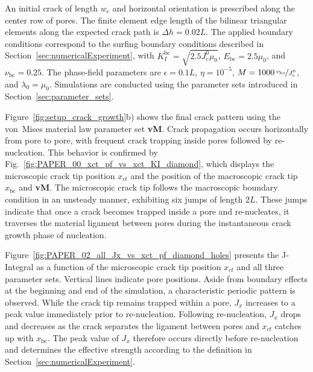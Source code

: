 \documentclass[pdflatex,sn-mathphys-num]{sn-jnl}%
\newcommand{\vMLabel}{\textbf{vM}\xspace}
\theoremstyle{thmstyleone}%
\theoremstyle{thmstyletwo}%
\theoremstyle{thmstylethree}%
\begin{document}
An initial crack of length $w_c$ and horizontal orientation is prescribed along the center row of pores. The finite element edge length of the bilinear triangular elements along the expected crack path is $\Delta h = 0.02L$. The applied boundary conditions correspond to the surfing boundary conditions described in Section~\ref{sec:numericalExperiment}, with $K_I^{\text{bc}} = \sqrt{2.5 J_c^0 \mu_0}$, $E_{\text{bc}} = 2.5 \mu_0$, and $\nu_{\text{bc}} = 0.25$. The phase-field parameters are $\epsilon = 0.1L$, $\eta = 10^{-5}$, $M = 1000\,\nicefrac{v_{\text{bc}}}{J_c^0}$, and $\lambda_0 = \mu_0$. Simulations are conducted  using the parameter sets introduced in Section~\ref{sec:parameter_sets}.

Figure~\ref{fig:setup_crack_growth}b) shows the final crack pattern  using the von~Mises material law parameter set \vMLabel. Crack propagation occurs horizontally from pore to pore, with frequent crack trapping inside pores followed by re-nucleation. This behavior is confirmed by Fig.~\ref{fig:PAPER_00_xct_pf_vs_xct_KI_diamond}, which displays the microscopic crack tip position $x_{ct}$ and the position of the macroscopic crack tip $x_{\text{bc}}$  and \vMLabel. The microscopic crack tip follows the macroscopic boundary condition in an unsteady manner, exhibiting six jumps of length $2L$. These jumps indicate that once a crack becomes trapped inside a pore and re-nucleates, it traverses the material ligament between pores during the instantaneous crack growth phase of nucleation.

Figure~\ref{fig:PAPER_02_all_Jx_vs_xct_pf_diamond_holes} presents the J-Integral as a function of the microscopic crack tip position $x_{ct}$  and all three parameter sets. Vertical lines indicate pore positions. Aside from boundary effects at the beginning and end of the simulation, a characteristic periodic pattern is observed. While the crack tip remains trapped within a pore, $J_x$ increases to a peak value immediately prior to re-nucleation. Following re-nucleation, $J_x$ drops and decreases as the crack separates the ligament between pores and $x_{ct}$ catches up with $x_{\text{bc}}$. The peak value of $J_x$ therefore occurs directly before re-nucleation and determines the effective strength according to the definition in Section~\ref{sec:numericalExperiment}.
\end{document}
